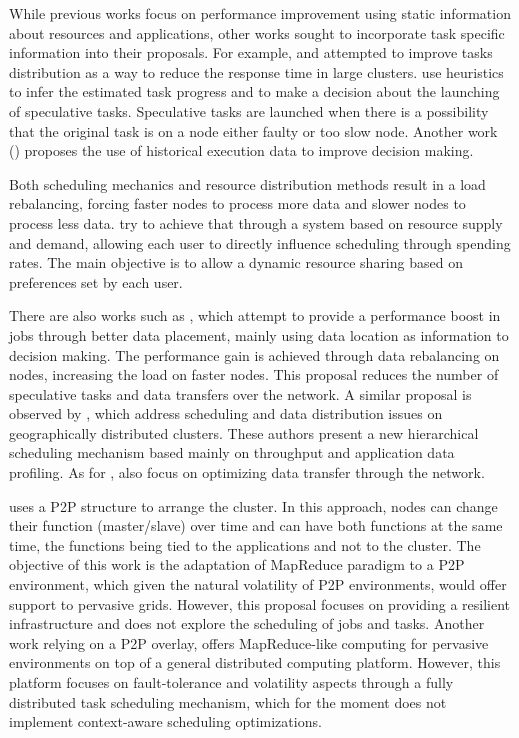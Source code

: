 While previous works focus on performance improvement using static information about resources and applications, other works sought to incorporate task specific information into their proposals. For example, \cite{Zaharia2008} and \cite{Chen} attempted to improve tasks distribution as a way to reduce the response time in large clusters. \cite{Zaharia2008} use heuristics to infer the estimated task progress and to make a decision about the launching of speculative tasks. Speculative tasks are launched when there is a possibility that the original task is on a node either faulty or too slow node. Another work (\cite{Chen}) proposes the use of historical execution data to improve decision making. 

Both scheduling mechanics and resource distribution methods result in a load rebalancing, forcing faster nodes to process more data and slower nodes to process less data. \cite{Sandholm2010} try to achieve that through a system based on resource supply and demand, allowing each user to directly influence scheduling through spending rates. The main objective is to allow a dynamic resource sharing based on preferences set by each user. 

There are also works such as \cite{Xie2010}, which attempt to provide a performance boost in jobs through better data placement, mainly using data location as information to decision making. The performance gain is achieved through data rebalancing on nodes, increasing the load on faster nodes. This proposal reduces the number of speculative tasks and data transfers over the network. A similar proposal is observed by \cite{Cavallo2015}, which address scheduling and data distribution issues on geographically distributed clusters. These authors present a new hierarchical scheduling mechanism based mainly on throughput and application data profiling. As for \cite{Xie2010}, \cite{Cavallo2015} also focus on optimizing data transfer through the network.     

\cite{Marozzo2012} uses a P2P structure to arrange the cluster. In this approach, nodes can change their function (master/slave) over time and can have both functions at the same time, the functions being tied to the applications and not to the cluster. The objective of this work is the adaptation of MapReduce paradigm to a P2P environment, which given the natural volatility of P2P environments, would offer support to pervasive grids. However, this proposal focuses on providing a resilient infrastructure and does not explore the scheduling of jobs and tasks. Another work relying on a P2P overlay, \cite{Steffenel20151034} offers MapReduce-like computing for pervasive environments on top of a general distributed computing platform. However, this platform focuses on fault-tolerance and volatility aspects through a fully distributed task scheduling mechanism, which for the moment does not implement context-aware scheduling optimizations.

